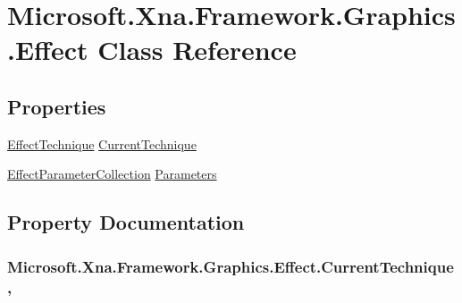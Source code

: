 \hypertarget{class_microsoft_1_1_xna_1_1_framework_1_1_graphics_1_1_effect}{}\section{Microsoft.\+Xna.\+Framework.\+Graphics.\+Effect Class Reference}
\label{class_microsoft_1_1_xna_1_1_framework_1_1_graphics_1_1_effect}
\subsection*{Properties}
\begin{DoxyCompactItemize}
\item 
\hyperlink{class_microsoft_1_1_xna_1_1_framework_1_1_graphics_1_1_effect_technique}{Effect\+Technique} \hyperlink{class_microsoft_1_1_xna_1_1_framework_1_1_graphics_1_1_effect_aa729f5ff6f541bda623ffc4989d0275a}{Current\+Technique}
\item 
\hyperlink{class_microsoft_1_1_xna_1_1_framework_1_1_graphics_1_1_effect_parameter_collection}{Effect\+Parameter\+Collection} \hyperlink{class_microsoft_1_1_xna_1_1_framework_1_1_graphics_1_1_effect_a47f593d18591757a0cc2ae630888fbdb}{Parameters}
\end{DoxyCompactItemize}


\subsection{Property Documentation}
\hypertarget{class_microsoft_1_1_xna_1_1_framework_1_1_graphics_1_1_effect_aa729f5ff6f541bda623ffc4989d0275a}{}
\subsubsection[{Current\+Technique}]{ Microsoft.\+Xna.\+Framework.\+Graphics.\+Effect.\+Current\+Technique\hspace{0.3cm}{\ttfamily [get]}, {\ttfamily [set]}}\label{class_microsoft_1_1_xna_1_1_framework_1_1_graphics_1_1_effect_aa729f5ff6f541bda623ffc4989d0275a}
\hypertarget{class_microsoft_1_1_xna_1_1_framework_1_1_graphics_1_1_effect_a47f593d18591757a0cc2ae630888fbdb}{}
